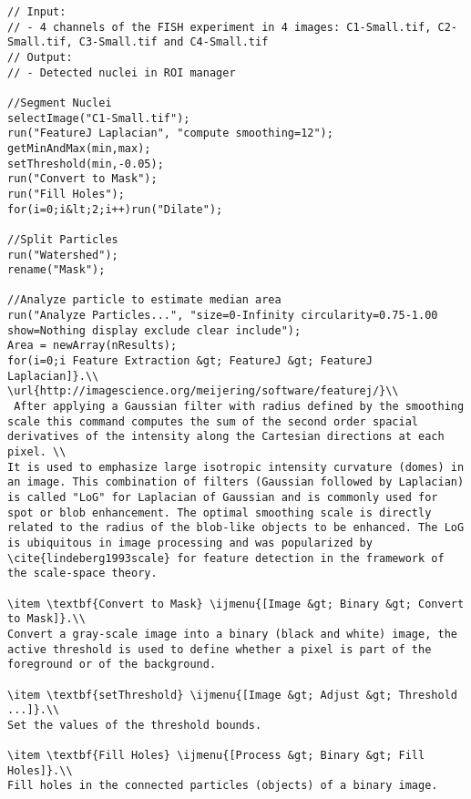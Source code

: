 \begin{lstlisting}[linerange={1-4}]
// Input: 
// - 4 channels of the FISH experiment in 4 images: C1-Small.tif, C2-Small.tif, C3-Small.tif and C4-Small.tif
// Output: 
// - Detected nuclei in ROI manager

//Segment Nuclei
selectImage("C1-Small.tif");
run("FeatureJ Laplacian", "compute smoothing=12");
getMinAndMax(min,max);
setThreshold(min,-0.05);
run("Convert to Mask");
run("Fill Holes");
for(i=0;i&lt;2;i++)run("Dilate");

//Split Particles
run("Watershed");
rename("Mask");

//Analyze particle to estimate median area
run("Analyze Particles...", "size=0-Infinity circularity=0.75-1.00 show=Nothing display exclude clear include"); 
Area = newArray(nResults);
for(i=0;i Feature Extraction &gt; FeatureJ &gt; FeatureJ Laplacian]}.\\
\url{http://imagescience.org/meijering/software/featurej/}\\
 After applying a Gaussian filter with radius defined by the smoothing scale this command computes the sum of the second order spacial derivatives of the intensity along the Cartesian directions at each pixel. \\
It is used to emphasize large isotropic intensity curvature (domes) in an image. This combination of filters (Gaussian followed by Laplacian) is called "LoG" for Laplacian of Gaussian and is commonly used for spot or blob enhancement. The optimal smoothing scale is directly related to the radius of the blob-like objects to be enhanced. The LoG is ubiquitous in image processing and was popularized by \cite{lindeberg1993scale} for feature detection in the framework of the scale-space theory.

\item \textbf{Convert to Mask} \ijmenu{[Image &gt; Binary &gt; Convert to Mask]}.\\
Convert a gray-scale image into a binary (black and white) image, the active threshold is used to define whether a pixel is part of the foreground or of the background. 

\item \textbf{setThreshold} \ijmenu{[Image &gt; Adjust &gt; Threshold ...]}.\\
Set the values of the threshold bounds.

\item \textbf{Fill Holes} \ijmenu{[Process &gt; Binary &gt; Fill Holes]}.\\
Fill holes in the connected particles (objects) of a binary image. 


\end{lstlisting}
